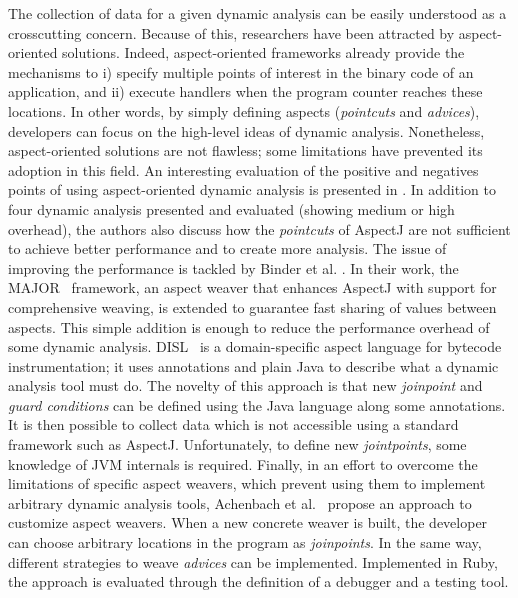 The collection of data for a given dynamic analysis can be easily understood as a crosscutting concern.
Because of this, researchers have been attracted by aspect-oriented solutions.
Indeed, aspect-oriented frameworks already provide the mechanisms to i) specify multiple points of interest in the binary code of an application, and ii) execute handlers when the program counter reaches these locations.
In other words, by simply defining aspects (\textit{pointcuts} and \textit{advices}), developers can focus on the high-level ideas of dynamic analysis.
Nonetheless, aspect-oriented solutions are not flawless; some limitations have prevented its adoption in this field.
An interesting evaluation of the positive and negatives points of using aspect-oriented dynamic analysis is presented in \cite{Pearce:2007:PA:1248445.1248448}.
In addition to four dynamic analysis presented and evaluated (showing medium or high overhead), the authors also discuss how the \textit{pointcuts} of AspectJ are not sufficient to achieve better performance and to create more analysis.
The issue of improving the performance is tackled by Binder et al. \cite{Binder:2006:FEM:1173706.1173733}.
In their work, the MAJOR~\cite{Villazon20111015} framework, an aspect weaver that enhances AspectJ with support for comprehensive weaving, is extended to guarantee fast sharing of values between aspects.
This simple addition is enough to reduce the performance overhead of some dynamic analysis.
DISL~\cite{Marek:2012:DEL:2162037.2162046,Marek2012} is a domain-specific aspect language for bytecode instrumentation; it uses annotations and plain Java to describe what a dynamic analysis tool must do.
The novelty of this approach is that new \textit{joinpoint} and \textit{guard conditions} can be defined using the Java language along some annotations.
It is then possible to collect data which is not accessible using a standard framework such as AspectJ.
Unfortunately, to define new \textit{jointpoints}, some knowledge of JVM internals is required.
Finally, in an effort to overcome the limitations of specific aspect weavers, which prevent using them to implement arbitrary dynamic analysis tools, Achenbach et al.~\cite{Achenbach:2010:MPD:1939399.1939415} propose an approach to customize aspect weavers.
When a new concrete weaver is built, the developer can choose arbitrary locations in the program as \textit{joinpoints}.
In the same way, different strategies to weave \textit{advices} can be implemented.
Implemented in Ruby, the approach is evaluated through the definition of a debugger and a testing tool.

